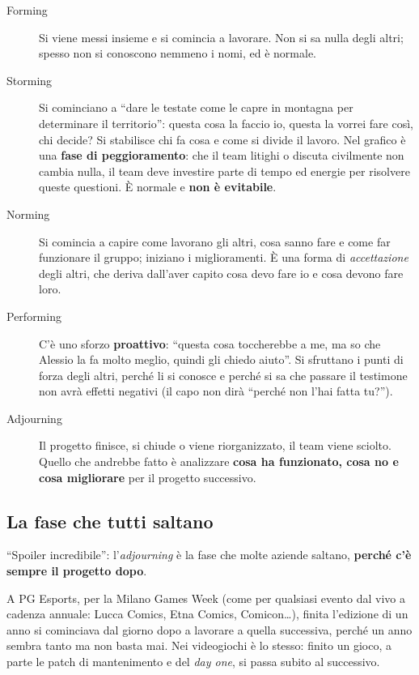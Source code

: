 \begin{description}
  \item[Forming] Si viene messi insieme e si comincia a lavorare. Non si sa
        nulla degli altri; spesso non si conoscono nemmeno i nomi, ed è
        normale.
  \item[Storming] Si cominciano a ``dare le testate come le capre in
        montagna per determinare il territorio'': questa cosa la faccio io,
        questa la vorrei fare così, chi decide? Si stabilisce chi fa cosa e
        come si divide il lavoro. Nel grafico è una \textbf{fase di
        peggioramento}: che il team litighi o discuta civilmente non cambia
        nulla, il team deve investire parte di tempo ed energie per risolvere
        queste questioni. È normale e \textbf{non è evitabile}.
  \item[Norming] Si comincia a capire come lavorano gli altri, cosa sanno
        fare e come far funzionare il gruppo; iniziano i miglioramenti. È una
        forma di \emph{accettazione} degli altri, che deriva dall'aver capito
        cosa devo fare io e cosa devono fare loro.
  \item[Performing] C'è uno sforzo \textbf{proattivo}: ``questa cosa
        toccherebbe a me, ma so che Alessio la fa molto meglio, quindi gli
        chiedo aiuto''. Si sfruttano i punti di forza degli altri, perché li
        si conosce e perché si sa che passare il testimone non avrà effetti
        negativi (il capo non dirà ``perché non l'hai fatta tu?'').
  \item[Adjourning] Il progetto finisce, si chiude o viene riorganizzato, il
        team viene sciolto. Quello che andrebbe fatto è analizzare
        \textbf{cosa ha funzionato, cosa no e cosa migliorare} per il
        progetto successivo.
\end{description}

\subsection{La fase che tutti saltano}

``Spoiler incredibile'': l'\emph{adjourning} è la fase che molte aziende
saltano, \textbf{perché c'è sempre il progetto dopo}.

A PG Esports, per la Milano Games Week (come per qualsiasi evento dal vivo a
cadenza annuale: Lucca Comics, Etna Comics, Comicon\dots), finita l'edizione
di un anno si cominciava dal giorno dopo a lavorare a quella successiva,
perché un anno sembra tanto ma non basta mai. Nei videogiochi è lo stesso:
finito un gioco, a parte le patch di mantenimento e del \emph{day one}, si
passa subito al successivo.

